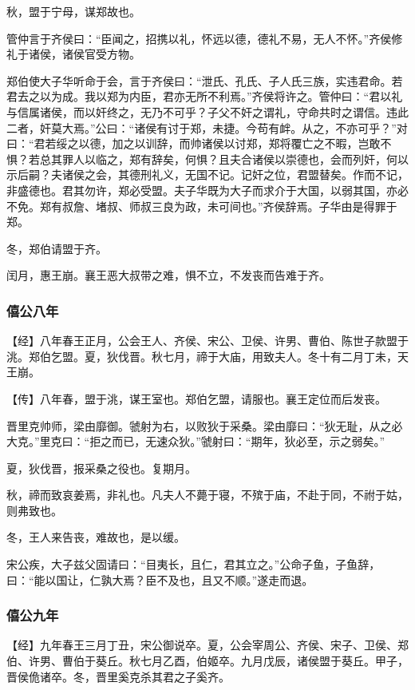 \documentclass[]{article}
\begin{document}
秋，盟于宁母，谋郑故也。

管仲言于齐侯曰：``臣闻之，招携以礼，怀远以德，德礼不易，无人不怀。''齐侯修礼于诸侯，诸侯官受方物。

郑伯使大子华听命于会，言于齐侯曰：``泄氏、孔氏、子人氏三族，实违君命。若君去之以为成。我以郑为内臣，君亦无所不利焉。''齐侯将许之。管仲曰：``君以礼与信属诸侯，而以奸终之，无乃不可乎？子父不奸之谓礼，守命共时之谓信。违此二者，奸莫大焉。''公曰：``诸侯有讨于郑，未捷。今苟有衅。从之，不亦可乎？''对曰：``君若绥之以德，加之以训辞，而帅诸侯以讨郑，郑将覆亡之不暇，岂敢不惧？若总其罪人以临之，郑有辞矣，何惧？且夫合诸侯以崇德也，会而列奸，何以示后嗣？夫诸侯之会，其德刑礼义，无国不记。记奸之位，君盟替矣。作而不记，非盛德也。君其勿许，郑必受盟。夫子华既为大子而求介于大国，以弱其国，亦必不免。郑有叔詹、堵叔、师叔三良为政，未可间也。''齐侯辞焉。子华由是得罪于郑。

冬，郑伯请盟于齐。

闰月，惠王崩。襄王恶大叔带之难，惧不立，不发丧而告难于齐。

\hypertarget{header-n729}{%
\subsubsection{僖公八年}\label{header-n729}}

【经】八年春王正月，公会王人、齐侯、宋公、卫侯、许男、曹伯、陈世子款盟于洮。郑伯乞盟。夏，狄伐晋。秋七月，禘于大庙，用致夫人。冬十有二月丁未，天王崩。

【传】八年春，盟于洮，谋王室也。郑伯乞盟，请服也。襄王定位而后发丧。

晋里克帅师，梁由靡御。虢射为右，以败狄于采桑。梁由靡曰：``狄无耻，从之必大克。''里克曰：``拒之而已，无速众狄。''虢射曰：``期年，狄必至，示之弱矣。''

夏，狄伐晋，报采桑之役也。复期月。

秋，禘而致哀姜焉，非礼也。凡夫人不薨于寝，不殡于庙，不赴于同，不祔于姑，则弗致也。

冬，王人来告丧，难故也，是以缓。

宋公疾，大子兹父固请曰：``目夷长，且仁，君其立之。''公命子鱼，子鱼辞，曰：``能以国让，仁孰大焉？臣不及也，且又不顺。''遂走而退。

\hypertarget{header-n739}{%
\subsubsection{僖公九年}\label{header-n739}}

【经】九年春王三月丁丑，宋公御说卒。夏，公会宰周公、齐侯、宋子、卫侯、郑伯、许男、曹伯于葵丘。秋七月乙酉，伯姬卒。九月戊辰，诸侯盟于葵丘。甲子，晋侯佹诸卒。冬，晋里奚克杀其君之子奚齐。
\end{document}
